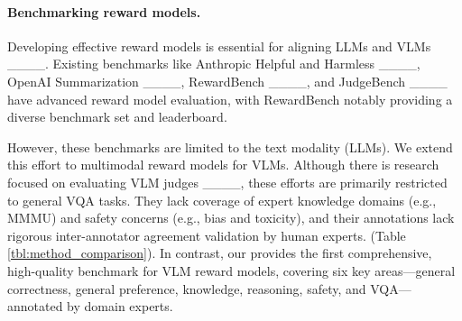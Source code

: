 \paragraph{Benchmarking reward models.}
Developing effective reward models is essential for aligning LLMs and VLMs ____. Existing benchmarks like Anthropic Helpful and Harmless ____, OpenAI Summarization ____, RewardBench ____, and JudgeBench ____ have advanced reward model evaluation, with RewardBench notably providing a diverse benchmark set and leaderboard.

However, these benchmarks are limited to the text modality (LLMs). We extend this effort to multimodal reward models for VLMs. Although there is research focused on evaluating VLM judges ____, these efforts are primarily restricted to general VQA tasks. They lack coverage of expert knowledge domains (e.g., MMMU) and safety concerns (e.g., bias and toxicity), and their annotations lack rigorous inter-annotator agreement validation by human experts. (Table \ref{tbl:method_comparison}). In contrast, our \methodname provides the first comprehensive, high-quality benchmark for VLM reward models, covering six key areas---general correctness, general preference, knowledge, reasoning, safety, and VQA---annotated by domain experts.